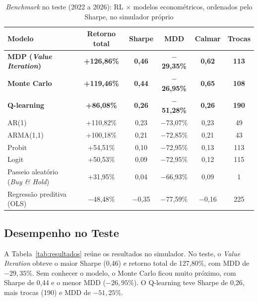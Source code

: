 \documentclass[conference]{IEEEtran}
\begin{document}
\begin{table}[!t]
  \centering
  \caption{\textit{Benchmark} no teste (2022 a 2026): RL $\times$ modelos econométricos, ordenados pelo Sharpe, no simulador próprio}
  \label{tab:benchmark}
  \footnotesize
  \setlength{\tabcolsep}{10pt}
  \renewcommand{\arraystretch}{1.1}
  \begin{tabular}{l ccccc}
    \toprule
    \textbf{Modelo} & \textbf{Retorno total} & \textbf{Sharpe} & \textbf{MDD} & \textbf{Calmar} & \textbf{Trocas} \\
    \midrule
    \textbf{MDP (\textit{Value Iteration})}   & \textbf{+126,86\%} & \textbf{0,46} & \textbf{$-$29,35\%} & \textbf{0,62} & \textbf{113} \\
    \textbf{Monte Carlo}                      & \textbf{+119,46\%} & \textbf{0,44} & \textbf{$-$26,95\%} & \textbf{0,65} & \textbf{108} \\
    \textbf{Q-learning}                       & \textbf{+86,08\%}  & \textbf{0,26} & \textbf{$-$51,28\%} & \textbf{0,26} & \textbf{190} \\
    \midrule
    AR(1)                                     & +110,82\%          & 0,23          & $-$73,07\%          & 0,23          & 49  \\
    ARMA(1,1)                                 & +100,18\%          & 0,21          & $-$72,85\%          & 0,21          & 43  \\
    Probit                                    & +54,51\%           & 0,10          & $-$72,95\%          & 0,13          & 113 \\
    Logit                                     & +50,53\%           & 0,09          & $-$72,95\%          & 0,12          & 115 \\
    Passeio aleatório (\textit{Buy \& Hold})  & +31,95\%           & 0,04          & $-$66,93\%          & 0,09          & 1   \\
    Regressão preditiva (OLS)                 & $-$48,48\%         & $-$0,35       & $-$77,59\%          & $-$0,16       & 225 \\
    \bottomrule
  \end{tabular}
\end{table}

\subsection{Desempenho no Teste}

A Tabela~\ref{tab:resultados} reúne os resultados no simulador. No teste, o \textit{Value Iteration} obteve o maior Sharpe (0,46) e retorno total de 127,80\%, com MDD de $-29{,}35\%$. Sem conhecer o modelo, o Monte Carlo ficou muito próximo, com Sharpe de 0,44 e o menor MDD ($-26{,}95\%$). O Q-learning teve Sharpe de 0,26, mais trocas (190) e MDD de $-51{,}25\%$.
\end{document}
